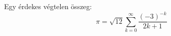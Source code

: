 \documentclass{article}
\begin{document}
Egy érdekes végtelen összeg:
\[
\pi = \sqrt{12}\sum^\infty_{k=0} \frac{ (-3)^{-k} }{ 2k+1 }
\]
\end{document}
